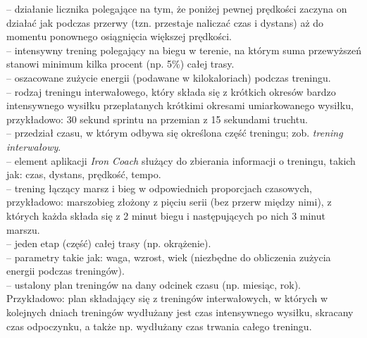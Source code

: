 \begin{multicols}{2}
\begin{description}
	-- działanie licznika polegające na tym, że poniżej pewnej prędkości zaczyna on działać jak podczas przerwy (tzn. przestaje naliczać czas i dystans) aż do momentu ponownego osiągnięcia większej prędkości.\\
	-- intensywny trening polegający na biegu w terenie, na którym suma przewyższeń stanowi minimum kilka procent (np. 5\%) całej trasy.\\
	-- oszacowane zużycie energii (podawane w kilokaloriach) podczas treningu.\\
	-- rodzaj treningu interwałowego, który składa się z krótkich okresów bardzo intensywnego wysiłku przeplatanych krótkimi okresami umiarkowanego wysiłku, przykładowo: 30 sekund sprintu na przemian z 15 sekundami truchtu.\\
	-- przedział czasu, w którym odbywa się określona część treningu; zob. \textit{trening interwałowy}.\\
	-- element aplikacji \textit{Iron Coach} służący do zbierania informacji o treningu, takich jak: czas, dystans, prędkość, tempo.\\
	-- trening łączący marsz i bieg w odpowiednich proporcjach czasowych, przykładowo: marszobieg złożony z pięciu serii (bez przerw między nimi), z których każda składa się z 2 minut biegu i następujących po nich 3 minut marszu.\\
	-- jeden etap (część) całej trasy (np. okrążenie).\\
	-- parametry takie jak: waga, wzrost, wiek (niezbędne do obliczenia zużycia energii podczas treningów).\\
	-- ustalony plan treningów na dany odcinek czasu (np. miesiąc, rok). Przykładowo: plan składający się z treningów interwałowych, w których w kolejnych dniach treningów wydłużany jest czas intensywnego wysiłku, skracany czas odpoczynku, a także np. wydłużany czas trwania całego treningu.\\

\end{description}
\end{multicols}
